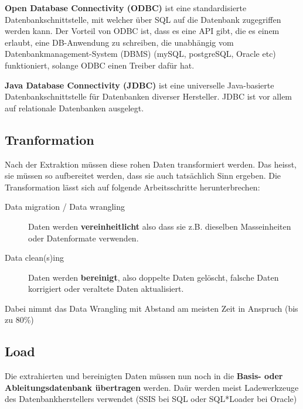 \documentclass[a4paper, 11pt, nofootinbib]{article}
\begin{document}
\noindent \textbf{Open Database Connectivity (ODBC)} ist eine standardisierte Datenbankschnittstelle, mit welcher über SQL auf die Datenbank zugegriffen werden kann. Der Vorteil von ODBC ist, dass es eine API gibt, die es einem erlaubt, eine DB-Anwendung zu schreiben, die unabhängig vom Datenbankmanagement-System (DBMS) (mySQL, postgreSQL, Oracle etc) funktioniert, solange ODBC einen Treiber dafür hat.

\vspace{10px}

\noindent \textbf{Java Database Connectivity (JDBC)} ist eine universelle Java-basierte Datenbankschnittstelle für Datenbanken diverser Hersteller. JDBC ist vor allem auf relationale Datenbanken ausgelegt.


\subsection{Tranformation}

Nach der Extraktion müssen diese rohen Daten transformiert werden. Das heisst, sie müssen so aufbereitet werden, dass sie auch tatsächlich Sinn ergeben. Die Transformation lässt sich auf folgende Arbeitsschritte herunterbrechen:

\begin{description}
	\item[Data migration / Data wrangling] Daten werden \textbf{vereinheitlicht} also dass sie z.B. dieselben Masseinheiten oder Datenformate verwenden.
	\item[Data clean(s)ing] Daten werden \textbf{bereinigt}, also doppelte Daten gelöscht, falsche Daten korrigiert oder veraltete Daten aktualisiert.
\end{description}

\vspace{10px}

\noindent Dabei nimmt das Data Wrangling mit Abstand am meisten Zeit in Anspruch (bis zu 80\%)


\subsection{Load}

Die extrahierten und bereinigten Daten müssen nun noch in die \textbf{Basis- oder Ableitungsdatenbank übertragen} werden. Daür werden meist Ladewerkzeuge des Datenbankherstellers verwendet (SSIS bei SQL oder SQL*Loader bei Oracle)

\vspace{10px}
\end{document}
